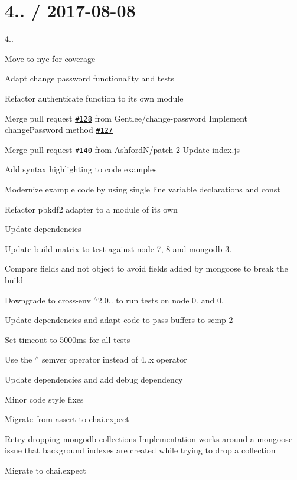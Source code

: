 \section*{4.. / 2017-\/08-\/08 }


\begin{DoxyItemize}
\item 4..
\item Move to nyc for coverage
\item Adapt change password functionality and tests
\item Refactor authenticate function to its own module
\item Merge pull request \href{https://github.com/saintedlama/passport-local-mongoose/issues/128}{\tt \#128} from Gentlee/change-\/password Implement change\+Password method \href{https://github.com/saintedlama/passport-local-mongoose/issues/127}{\tt \#127}
\item Merge pull request \href{https://github.com/saintedlama/passport-local-mongoose/issues/140}{\tt \#140} from Ashford\+N/patch-\/2 Update index.\+js
\item Add syntax highlighting to code examples
\item Modernize example code by using single line variable declarations and const
\item Refactor pbkdf2 adapter to a module of its own
\item Update dependencies
\item Update build matrix to test against node 7, 8 and mongodb 3.
\item Compare fields and not object to avoid fields added by mongoose to break the build
\item Downgrade to cross-\/env $^\wedge$2.0.. to run tests on node 0. and 0.
\item Update dependencies and adapt code to pass buffers to scmp 2
\item Set timeout to 5000ms for all tests
\item Use the $^\wedge$ semver operator instead of 4..\+x operator
\item Update dependencies and add debug dependency
\item Minor code style fixes
\item Migrate from assert to chai.\+expect
\item Retry dropping mongodb collections Implementation works around a mongoose issue that background indexes are created while trying to drop a collection
\item Migrate to chai.\+expect

\end{DoxyItemize}
